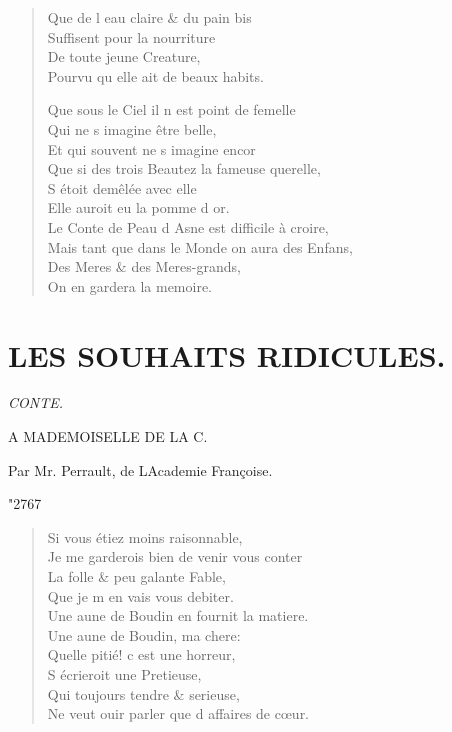 \documentclass[14pt,a4paper]{memoir}
\newcommand{\spacer}{%
  \par\vspace{1\baselineskip}%
  \begin{center}%
    {\HUGE \char"2767}%
  \end{center}%
  \vspace{1\baselineskip}\par%
}
\begin{document}
{{\begin{otherlanguage}{french}
\begin{verse}
\vin Que de l\textquotesingle{} eau claire \& du pain bis \\
\vin Suffisent pour la nourriture \\
\vin De toute jeune Creature, \\
\vin Pourvu qu\textquotesingle{} elle ait de beaux habits.

\vin Que sous le Ciel il n\textquotesingle{} est point de femelle \\
\vin Qui ne s\textquotesingle{} imagine être belle, \\
\vin Et qui souvent ne s\textquotesingle{} imagine encor \\
Que si des trois Beautez la fameuse querelle, \\
\vin S\textquotesingle{} étoit demêlée avec elle \\
\vin Elle auroit eu la pomme d\textquotesingle{} or. \\
Le Conte de Peau d\textquotesingle{} Asne est difficile à croire, \\
Mais tant que dans le Monde on aura des Enfans, \\
\vin Des Meres \& des Meres-grands, \\
\vin On en gardera la memoire.
\end{verse}

\chapter{LES SOUHAITS RIDICULES.}

\begin{flushright}
\itshape
CONTE.

A MADEMOISELLE DE LA C.

Par Mr. Perrault, de L\textquotesingle Academie Françoise.
\end{flushright}

\spacer

\begin{verse}
Si vous étiez moins raisonnable, \\
\vin Je me garderois bien de venir vous conter \\
\vin La folle \& peu galante Fable, \\
\vin Que je m\textquotesingle{} en vais vous debiter. \\
Une aune de Boudin en fournit la matiere. \\
\vin Une aune de Boudin, ma chere: \\
\vin Quelle pitié! c\textquotesingle{} est une horreur, \\
\vin S\textquotesingle{} écrieroit une Pretieuse, \\
\vin Qui toujours tendre \& serieuse, \\
Ne veut ouir parler que d\textquotesingle{} affaires de cœur.


\end{verse}
\end{otherlanguage}}}
\end{document}
